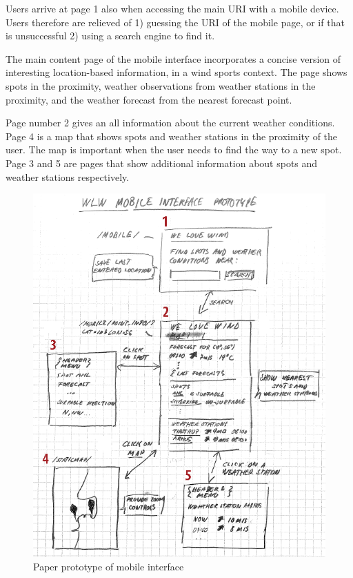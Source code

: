 Users arrive at page 1 also when accessing the main URI with a mobile
device. Users therefore are relieved of 1) guessing the URI of the mobile page,
or if that is unsuccessful 2) using a search engine to find it.

The main content page of the mobile interface incorporates a concise version of
interesting location-based information, in a wind sports context. The page shows
spots in the proximity, weather observations from weather stations in the
proximity, and the weather forecast from the nearest forecast point. 

Page number 2 gives an all information about the current weather conditions. Page
4 is a map that shows spots and weather stations in the proximity of the
user. The map is important when the user needs to find the way to a new
spot. Page 3 and 5 are pages that show additional information about spots and
weather stations respectively.

\begin{figure}[htbp]
  \centering
  \includegraphics[width=12cm]{./Figures/mobile_prototype}
  \caption{Paper prototype of mobile interface}
  \label{fig:mob_prototype}
\end{figure}

